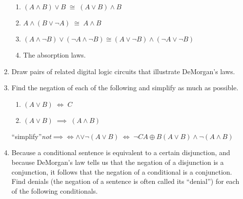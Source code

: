 \documentclass[10pt,]{book}
\theoremstyle{plain}
\theoremstyle{definition}
\theoremstyle{definition}
\numberwithin{equation}{section}
\newcommand{\hint}[1]{ }
\begin{document}
\begin{enumerate}[label=(\alph*)]
\begin{enumerate}[label=\roman*.]
\item\hypertarget{li-136}{}
          \((A \land B) \lor B \; \cong \; (A \lor B) \land B\)
\item\hypertarget{li-137}{}
          \(A \land (B \lor {\lnot}A) \; \cong \; A \land B\)
\item\hypertarget{li-138}{}
          \((A \land {\lnot}B) \lor ({\lnot}A \land {\lnot}B) \cong
          (A \lor {\lnot}B) \land ({\lnot}A \lor {\lnot}B)\)
\item\hypertarget{li-139}{}
          The absorption laws.
\end{enumerate}

\item\hypertarget{li-140}{}
        Draw pairs of related digital logic circuits that illustrate
        DeMorgan's laws.



        \hint{
        Here's the pair that shows the negation of an AND is the same as the OR of the same inputs negated.

        \
        \texttt{[image: images/DeMorgan.png]}

        }
\item\hypertarget{li-141}{}
    Find the negation of each of the following and simplify as much as possible.

\begin{enumerate}[label=\roman*.]
\item\hypertarget{li-142}{}
          \((A \lor B) \; \iff \; C\)
\item\hypertarget{li-143}{}
          \((A \lor B) \; \implies \; (A \land B)\)
\end{enumerate}

``simplify''\emph{not}\(\implies\)\(\iff\)\(\land\)\(\lor\)\(\lnot\)\((A \lor B) \; \iff \; {\lnot}C\)\textemdash{}\(A \oplus B\)\((A \lor B) \land {\lnot}(A \land B)\)\textemdash{}\item\hypertarget{li-144}{}
    Because a conditional sentence is equivalent to a certain disjunction, and 
    because DeMorgan's law tells us that the negation of a disjunction is a conjunction,
    it follows that the negation of a conditional is a conjunction.  Find denials (the negation
    of a sentence is often called its ``denial'') for each of the following conditionals.


\end{enumerate}
\end{document}
